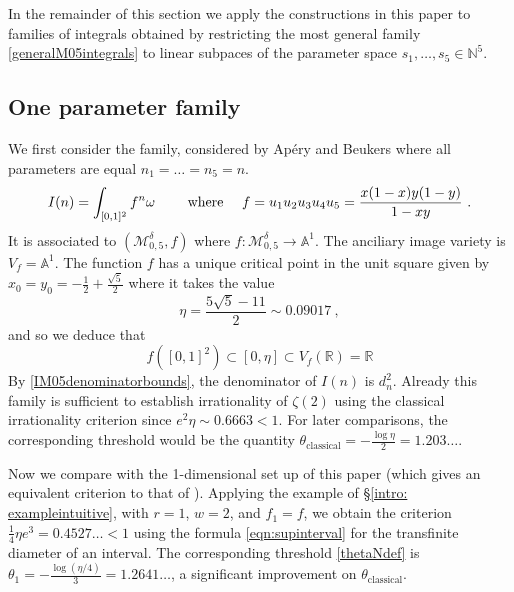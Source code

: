 \documentclass[a4paper,10pt]{amsart}
\theoremstyle{definition}
\theoremstyle{remark}
\numberwithin{equation}{section}
\newcommand{\R}{\mathbb R}
\newcommand{\N}{\mathbb N}
\newcommand{\0}{\color{blue}{\mathsf{0}}}
\begin{document}
    
   In the remainder of this section we apply  the constructions in this paper to  families of integrals obtained by restricting 
    the most general family \eqref{generalM05integrals} to  linear subpaces of the parameter space $s_1,\ldots, s_5 \in \N^5$.
        
    \subsection{One parameter family} We first consider the family, considered by Ap\'ery and Beukers  \cite{Apery, Beukers} where all parameters are equal  $n_1=\ldots=n_5=n$.  
    \[ I(n) = \int_{[0,1]^2}  f^n \omega\quad \quad \hbox{ where }\quad  f=  u_1u_2u_3u_4u_5= \frac{x(1-x)y(1-y)}{1-xy}  \ . \]
     It is associated to $(\mathcal{M}_{0,5}^{\delta}, f)$ where $f: \mathcal{M}_{0,5}^{\delta}\rightarrow \mathbb{A}^1$.  The anciliary image variety is $V_f = \mathbb{A}^1$.
     The function $f$ has a unique critical point in the unit square  given by $x_0=y_0 = - \frac{1}{2}  + \frac{\sqrt{5}}{2}$ where it takes the value 
     \begin{equation}\label{etadef}   \eta =  \frac{5\sqrt{5} -11 }{2} \sim 0.09017 \ , \end{equation} 
     and so we deduce that 
     \[  f([0,1]^2) \subset  [0,\eta] \subset V_f(\R) = \R\] 
 By \eqref{IM05denominatorbounds}, the denominator of $I(n)$ is $d_n^2$.        
   Already this family is sufficient to establish irrationality of $\zeta(2)$ using the classical irrationality criterion since $e^2 \eta \sim 0.6663 < 1$. For later comparisons, the corresponding threshold 
   would be the quantity $\theta_{\mathrm{classical}} = -\frac{\log \eta}{2} = 1.203\ldots$. 
    
    Now we compare with the 1-dimensional set up of this paper (which gives an equivalent criterion to that of \cite{ZudilinDet}). Applying the example of \S\ref{intro: exampleintuitive}, with $r=1$, $w=2$, and $f_1=f$, we obtain the 
  criterion   $\frac{1}{4} \eta e^3 =0.4527\ldots< 1$ using the formula   \eqref{eqn:supinterval} for the transfinite diameter  of an interval. The corresponding threshold \eqref{thetaNdef}
   is $\theta_{1} =  - \frac{\log(\eta/4)}{3}= 1.2641\ldots$, a significant improvement on $\theta_{\mathrm{classical}}$. 
\end{document}
